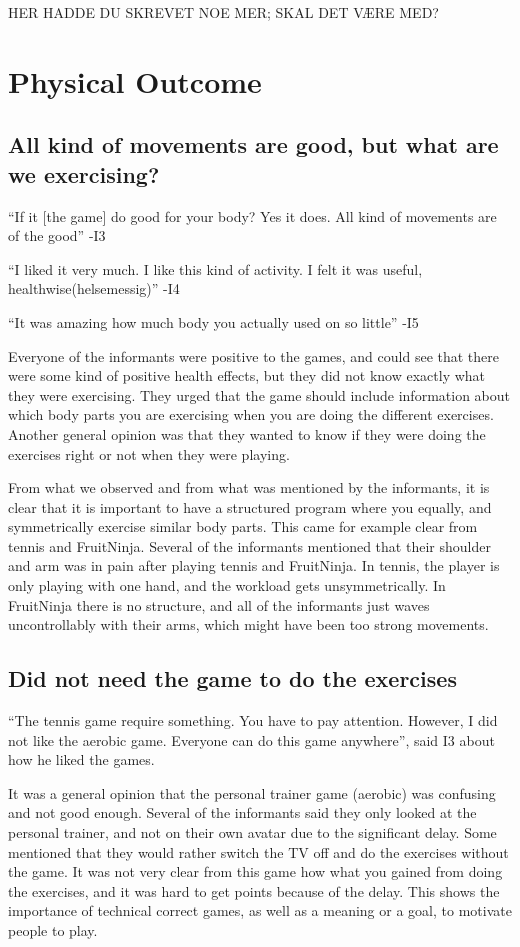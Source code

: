 HER HADDE DU SKREVET NOE MER; SKAL DET VÆRE MED?

\section{Physical Outcome}
\subsection{All kind of movements are good, but what are we exercising?}
 “If it [the game] do good for your body? Yes it does. All kind of movements are of the good” -I3

“I liked it very much. I like this kind of activity. I felt it was useful, healthwise(helsemessig)” -I4 

“It was amazing how much body you actually used on so little” -I5

Everyone of the informants were positive to the games, and could see that there were some kind of positive health effects, but they did not know exactly what they were exercising. They urged that the game should include information about which body parts you are exercising when you are doing the different exercises. Another general opinion was that they wanted to know if they were doing the exercises right or not when they were playing. 

From what we observed and from what was mentioned by the informants, it is clear that it is important to have a structured program where you equally, and symmetrically exercise similar body parts. This came for example clear from tennis and FruitNinja. Several of the informants mentioned that their shoulder and arm was in pain after playing tennis and FruitNinja. In tennis, the player is only playing with one hand, and the workload gets unsymmetrically. In FruitNinja there is no structure, and all of the informants just waves uncontrollably with their arms, which might have been too strong movements.

\subsection{Did not need the game to do the exercises}
“The tennis game require something. You have to pay attention. However, I did not like the aerobic game. Everyone can do this game anywhere”, said I3 about how he liked the games. 

It was a general opinion that the personal trainer game (aerobic) was confusing and not good enough. Several of the informants said they only looked at the personal trainer, and not on their own avatar due to the significant delay. Some mentioned that they would rather switch the TV off and do the exercises without the game. It was not very clear from this game how what you gained from doing the exercises, and it was hard to get points because of the delay. This shows the importance of technical correct games, as well as a meaning or a goal, to motivate people to play. 

